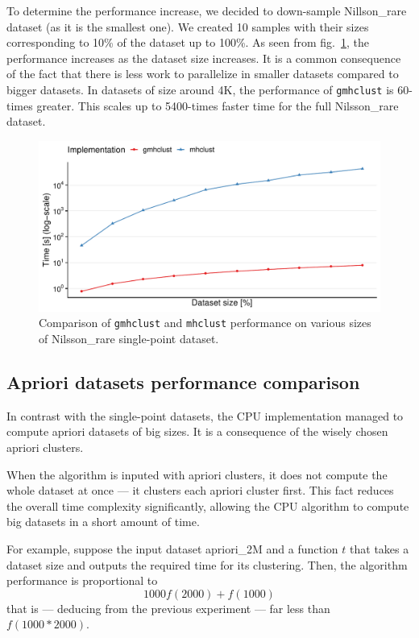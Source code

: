 To determine the performance increase, we decided to down-sample Nillson\_rare dataset (as it is the smallest one). We created 10 samples with their sizes corresponding to 10\% of the dataset up to 100\%.
As seen from fig.~\ref{fig04:single_perf}, the performance increases as the dataset size increases. It is a common consequence of the fact that there is less work to parallelize in smaller datasets compared to bigger datasets. In datasets of size around 4K, the performance of \texttt{gmhclust} is 60-times greater. This scales up to 5400-times faster time for the full Nilsson\_rare dataset.

\begin{figure}\centering
	\includegraphics[width=\linewidth]{img/single_perf_comp}
	\caption{Comparison of \texttt{gmhclust} and \texttt{mhclust} performance on various sizes of Nilsson\_rare single-point dataset.}
	\label{fig04:single_perf}
\end{figure}

\subsection{Apriori datasets performance comparison}

In contrast with the single-point datasets, the CPU implementation managed to compute apriori datasets of big sizes. It is a consequence of the wisely chosen apriori clusters.

When the algorithm is inputed with apriori clusters, it does not compute the whole dataset at once --- it clusters each apriori cluster first. This fact reduces the overall time complexity significantly, allowing the CPU algorithm to compute big datasets in a short amount of time.

For example, suppose the input dataset apriori\_2M and a function $t$ that takes a dataset size and outputs the required time for its clustering. Then, the algorithm performance is proportional to $$1000f(2000)+f(1000)$$ that is --- deducing from the previous experiment --- far less than $f(1000*2000)$.

